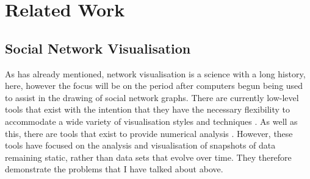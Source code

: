 \documentclass[12pt,a4paper]{article}
\begin{document}
%

\section{Related Work}

\subsection{Social Network Visualisation}
\noindent
As has already mentioned, network visualisation is a science with a long history, here, however the focus will be on the period after computers begun being used to assist in the drawing of social network graphs. There are currently low-level tools that exist with the intention that they have the necessary flexibility to accommodate a wide variety of visualisation styles and techniques \cite{heer2005prefuse}. As well as this, there are tools that exist to provide numerical analysis \cite{borgatti2002ucinet}. However, these tools have focused on the analysis and visualisation of snapshots of data remaining static, rather than data sets that evolve over time. They therefore demonstrate the problems that I have talked about above.
\end{document}
